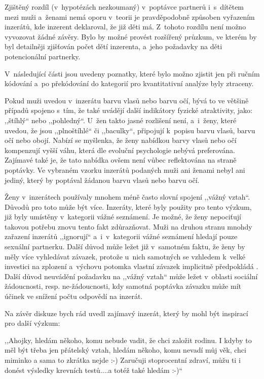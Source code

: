 \documentclass[a4paper, 12pt, notitlepage, oneside, numbers=noenddot]{report}
\begin{document}
Zjištěný rozdíl (v~hypotézách nezkoumaný) v~poptávce partnerů
i~s~dítětem mezi muži a~ženami nemá oporu v~teorii je pravděpodobně
způsoben vyřazením inzerátů, kde inzerent deklaroval, že již děti má.
Z~tohoto rozdílu není možno vyvozovat žádné závěry.  Bylo by možné
provést rozšířený průzkum, ve kterém by byl detailněji zjišťován počet
dětí inzerenta, a~jeho požadavky na děti potencionální partnerky.

V~následující části jsou uvedeny poznatky, které bylo možno zjistit
jen při ručním kódování a~po překódování do kategorií pro
kvantitativní analýze byly ztraceny.

Pokud muži uvedou v~inzerátu barvu vlasů nebo barvu očí, bývá to ve
většině případů spojeno s~tím, že také uvádějí další indikátory
fyzické atraktivity, jako: ,,štíhlý`` nebo ,,pohledný``. U~žen takto
jasné rozlišení není, a~i~ženy, které uvedou, že jsou ,,plnoštíhlé``
či ,,baculky``, připojují k~popisu barvu vlasů, barvu očí nebo
obojí. Nabízí se myšlenka, že ženy nabídkou barvy vlasů nebo očí
kompenzují vyšší váhu, která dle evoluční psychologie nebývá
preferována.  Zajímavé také je, že tato nabídka ovšem není vůbec
reflektována na straně poptávky.  Ve vybraném vzorku inzerátů podaných
muži ani ženami nebyl ani jediný, který by poptával žádanou barvu
vlasů nebo barvu očí.

Ženy v~inzerátech používaly mnohem méně často slovní spojení ,,vážný
vztah``.  Důvodů pro toto může být více.  Inzeráty, které byly použity
pro tento výzkum, již byly umístěny v~kategorii vážné seznámení.  Je
možné, že ženy nepociťují takovou potřebu znovu tento fakt
zdůrazňovat.  Muži na druhou stranu mnohdy zařazení inzerátů
,,ignorují`` a~i~v~kategorii vážné seznámení hledají pouze sexuální
partnerku.  Další důvod může ležet již v~samotném faktu, že ženy by
měly více vyhledávat závazek, protože u~nich samotných se vzhledem
k~velké investici na zplození a~výchovu potomka vlastní závazek
implicitně předpokládá \citep{Trivers1972}.  Další důvod neuvádění
požadavku na ,,vážný vztah`` může ležet v~oblasti sociální
žádoucnosti, resp. ne-žádoucnosti, kdy samotná poptávka závazku může
mít účinek ve snížení počtu odpovědí na inzerát.

Na závěr diskuze bych rád uvedl zajímavý inzerát, který by mohl být
inspirací pro další výzkum:

,,Ahojky, hledám někoho, komu nebude vadit, že chci založit rodinu. I
kdyby to měl být třeba jen přátelský vztah, hledám někoho, komu nevadí
můj věk, chci miminko a sama to zkrátka nejde :-) Zaručuji
stoprocentní zdraví, můžu ti i donést výsledky krevních testů....a
totéž také hledám :-)``
\end{document}
